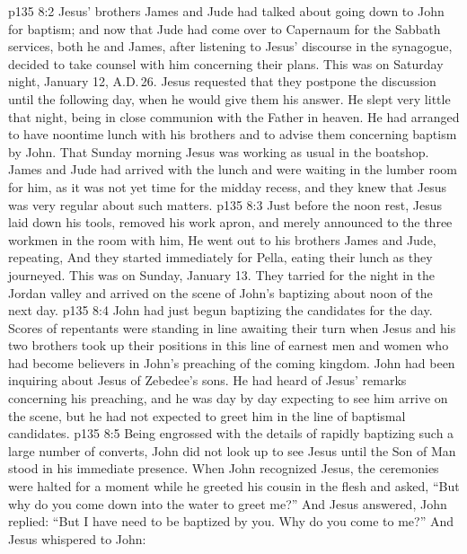 \vs p135 8:2 Jesus’ brothers James and Jude had talked about going down to John for baptism; and now that Jude had come over to Capernaum for the Sabbath services, both he and James, after listening to Jesus’ discourse in the synagogue, decided to take counsel with him concerning their plans. This was on Saturday night, January 12, A.D.\,26. Jesus requested that they postpone the discussion until the following day, when he would give them his answer. He slept very little that night, being in close communion with the Father in heaven. He had arranged to have noontime lunch with his brothers and to advise them concerning baptism by John. That Sunday morning Jesus was working as usual in the boatshop. James and Jude had arrived with the lunch and were waiting in the lumber room for him, as it was not yet time for the midday recess, and they knew that Jesus was very regular about such matters.
\vs p135 8:3 Just before the noon rest, Jesus laid down his tools, removed his work apron, and merely announced to the three workmen in the room with him,  He went out to his brothers James and Jude, repeating,  And they started immediately for Pella, eating their lunch as they journeyed. This was on Sunday, January 13. They tarried for the night in the Jordan valley and arrived on the scene of John’s baptizing about noon of the next day.
\vs p135 8:4 \pc John had just begun baptizing the candidates for the day. Scores of repentants were standing in line awaiting their turn when Jesus and his two brothers took up their positions in this line of earnest men and women who had become believers in John’s preaching of the coming kingdom. John had been inquiring about Jesus of Zebedee’s sons. He had heard of Jesus’ remarks concerning his preaching, and he was day by day expecting to see him arrive on the scene, but he had not expected to greet him in the line of baptismal candidates.
\vs p135 8:5 Being engrossed with the details of rapidly baptizing such a large number of converts, John did not look up to see Jesus until the Son of Man stood in his immediate presence. When John recognized Jesus, the ceremonies were halted for a moment while he greeted his cousin in the flesh and asked, “But why do you come down into the water to greet me?” And Jesus answered,  John replied: “But I have need to be baptized by you. Why do you come to me?” And Jesus whispered to John: 
